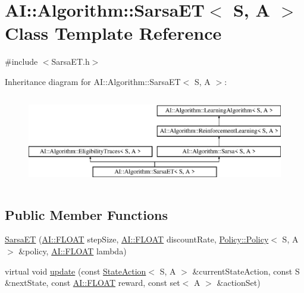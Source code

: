 \hypertarget{classAI_1_1Algorithm_1_1SarsaET}{\section{A\-I\-:\-:Algorithm\-:\-:Sarsa\-E\-T$<$ S, A $>$ Class Template Reference}
\label{classAI_1_1Algorithm_1_1SarsaET}
}


{\ttfamily \#include $<$Sarsa\-E\-T.\-h$>$}

Inheritance diagram for A\-I\-:\-:Algorithm\-:\-:Sarsa\-E\-T$<$ S, A $>$\-:\begin{figure}[H]
\begin{center}
\leavevmode
\includegraphics[height=4.000000cm]{classAI_1_1Algorithm_1_1SarsaET}
\end{center}
\end{figure}
\subsection*{Public Member Functions}
\begin{DoxyCompactItemize}
\item 
\hyperlink{classAI_1_1Algorithm_1_1SarsaET_aa934143376cc47c6e42e3ec67fb93eae}{Sarsa\-E\-T} (\hyperlink{namespaceAI_a41b74884a20833db653dded3918e05c3}{A\-I\-::\-F\-L\-O\-A\-T} step\-Size, \hyperlink{namespaceAI_a41b74884a20833db653dded3918e05c3}{A\-I\-::\-F\-L\-O\-A\-T} discount\-Rate, \hyperlink{classAI_1_1Algorithm_1_1Policy_1_1Policy}{Policy\-::\-Policy}$<$ S, A $>$ \&policy, \hyperlink{namespaceAI_a41b74884a20833db653dded3918e05c3}{A\-I\-::\-F\-L\-O\-A\-T} lambda)
\item 
virtual void \hyperlink{classAI_1_1Algorithm_1_1SarsaET_adf13376b7ec8fdfa2b19ffadb1aa81e7}{update} (const \hyperlink{classAI_1_1StateAction}{State\-Action}$<$ S, A $>$ \&current\-State\-Action, const S \&next\-State, const \hyperlink{namespaceAI_a41b74884a20833db653dded3918e05c3}{A\-I\-::\-F\-L\-O\-A\-T} reward, const set$<$ A $>$ \&action\-Set)
\end{DoxyCompactItemize}
